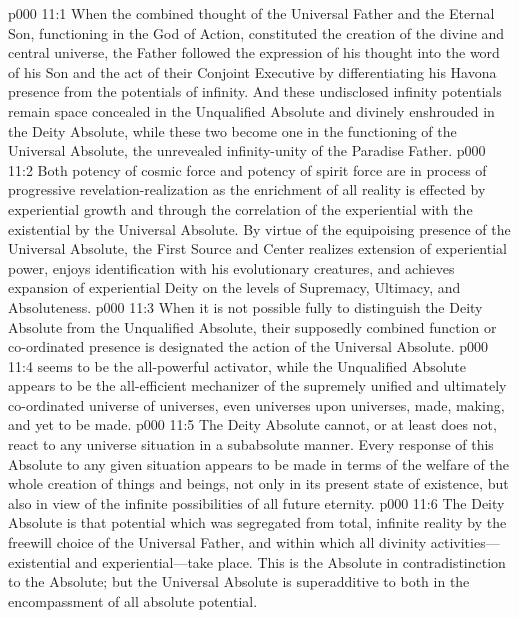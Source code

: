 \vs p000 11:1 When the combined thought of the Universal Father and the Eternal Son, functioning in the God of Action, constituted the creation of the divine and central universe, the Father followed the expression of his thought into the word of his Son and the act of their Conjoint Executive by differentiating his Havona presence from the potentials of infinity. And these undisclosed infinity potentials remain space concealed in the Unqualified Absolute and divinely enshrouded in the Deity Absolute, while these two become one in the functioning of the Universal Absolute, the unrevealed infinity\hyp{}unity of the Paradise Father.
\vs p000 11:2 Both potency of cosmic force and potency of spirit force are in process of progressive revelation\hyp{}realization as the enrichment of all reality is effected by experiential growth and through the correlation of the experiential with the existential by the Universal Absolute. By virtue of the equipoising presence of the Universal Absolute, the First Source and Center realizes extension of experiential power, enjoys identification with his evolutionary creatures, and achieves expansion of experiential Deity on the levels of Supremacy, Ultimacy, and Absoluteness.
\pc \vs p000 11:3 When it is not possible fully to distinguish the Deity Absolute from the Unqualified Absolute, their supposedly combined function or co\hyp{}ordinated presence is designated the action of the Universal Absolute.
\pc \vs p000 11:4 \bibnobreakspace {} seems to be the all\hyp{}powerful activator, while the Unqualified Absolute appears to be the all\hyp{}efficient mechanizer of the supremely unified and ultimately co\hyp{}ordinated universe of universes, even universes upon universes, made, making, and yet to be made.
\vs p000 11:5 The Deity Absolute cannot, or at least does not, react to any universe situation in a subabsolute manner. Every response of this Absolute to any given situation appears to be made in terms of the welfare of the whole creation of things and beings, not only in its present state of existence, but also in view of the infinite possibilities of all future eternity.
\vs p000 11:6 The Deity Absolute is that potential which was segregated from total, infinite reality by the freewill choice of the Universal Father, and within which all divinity activities---existential and experiential---take place. This is the  Absolute in contradistinction to the  Absolute; but the Universal Absolute is superadditive to both in the encompassment of all absolute potential.
